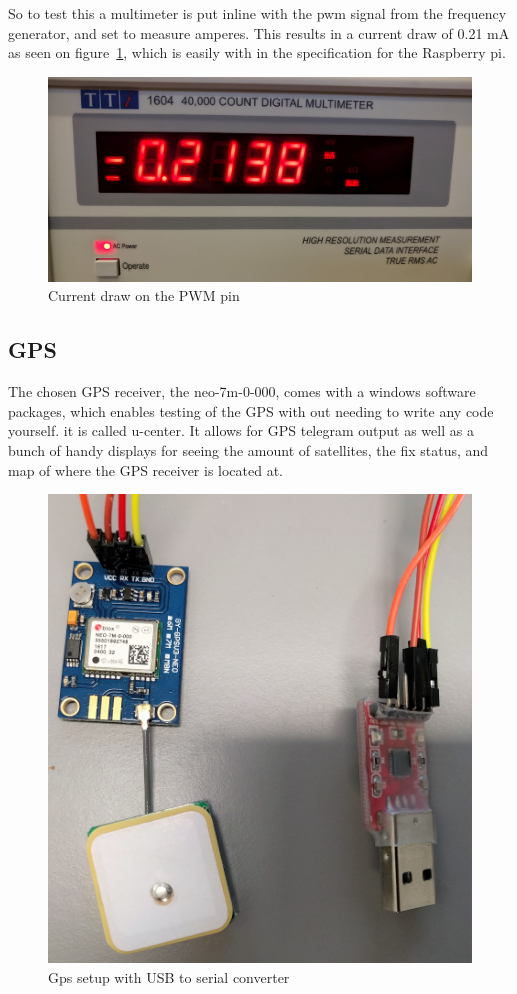 So to test this a multimeter is put inline with the pwm signal from the frequency generator, and set to measure amperes.
This results in a current draw of 0.21 mA as seen on figure~\ref{fig:pwmcurrentdraw}, which is easily with in the specification for the Raspberry pi.

\begin{figure}[H]
\centering
\includegraphics[width=0.4\linewidth]{Images/Implementation/pwm_current_draw}
\caption{Current draw on the PWM pin}
\label{fig:pwmcurrentdraw}
\end{figure}



\subsection{GPS}
The chosen GPS receiver, the neo-7m-0-000, comes with a windows software packages, which enables testing of the GPS with out needing to write any code yourself. it is called u-center. It allows for GPS telegram output as well as a bunch of handy displays for seeing the amount of satellites, the fix status, and map of where the GPS receiver is located at. 

\begin{figure}[H]
\centering
\includegraphics[width=0.4\linewidth]{Images/Implementation/gps_setup}
\caption{Gps setup with USB to serial converter}
\label{fig:gps_test_setup}
\end{figure}


